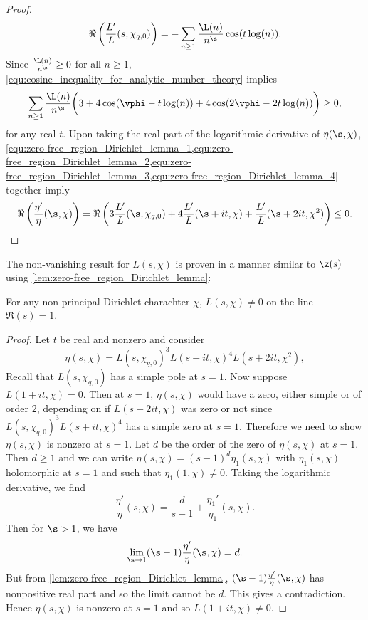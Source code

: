 \begin{proof}
\begin{equation}
          \Re\left(\frac{L'}{L}(s,\chi_{q,0})\right) = -\sum_{n \ge 1}\frac{\L(n)}{n^{\s}}\cos(t\log(n)).
        \end{equation}
        Since $\frac{\L(n)}{n^{\s}} \ge 0$ for all $n \ge 1$, \cref{equ:cosine_inequality_for_analytic_number_theory} implies
        \begin{equation}\label{equ:zero-free_region_Dirichlet_lemma_4}
          \sum_{n \ge 1}\frac{\L(n)}{n^{\s}}\bigg(3+4\cos(\vphi-t\log(n))+4\cos(2\vphi-2t\log(n))\bigg) \ge 0,
        \end{equation}
        for any real $t$. Upon taking the real part of the logarithmic derivative of $\eta(\s,\chi)$, \cref{equ:zero-free_region_Dirichlet_lemma_1,equ:zero-free_region_Dirichlet_lemma_2,equ:zero-free_region_Dirichlet_lemma_3,equ:zero-free_region_Dirichlet_lemma_4} together imply
        \[
          \Re\left(\frac{\eta'}{\eta}(\s,\chi)\right) = \Re\left(3\frac{L'}{L}(\s,\chi_{q,0})+4\frac{L'}{L}(\s+it,\chi)+\frac{L'}{L}(\s+2it,\chi^{2})\right) \le 0.
        \]
      \end{proof}

      The non-vanishing result for $L(s,\chi)$ is proven in a manner similar to $\z(s)$ using \cref{lem:zero-free_region_Dirichlet_lemma}:

      \begin{theorem}\label{thm:non-vanishing_of_Dirichlet_on_Re(s)=1}
        For any non-principal Dirichlet charachter $\chi$, $L(s,\chi) \neq 0$ on the line $\Re(s) = 1$.
      \end{theorem}
      \begin{proof}
        Let $t$ be real and nonzero and consider
        \[
          \eta(s,\chi) = L(s,\chi_{q,0})^{3}L(s+it,\chi)^{4}L(s+2it,\chi^{2}),
        \]
        Recall that $L(s,\chi_{q,0})$ has a simple pole at $s = 1$. Now suppose $L(1+it,\chi) = 0$. Then at $s = 1$, $\eta(s,\chi)$ would have a zero, either simple or of order $2$, depending on if $L(s+2it,\chi)$ was zero or not since $L(s,\chi_{q,0})^{3}L(s+it,\chi)^{4}$ has a simple zero at $s = 1$. Therefore we need to show $\eta(s,\chi)$ is nonzero at $s = 1$. Let $d$ be the order of the zero of $\eta(s,\chi)$ at $s = 1$. Then $d \ge 1$ and we can write $\eta(s,\chi) = (s-1)^{d}\eta_{1}(s,\chi)$ with $\eta_{1}(s,\chi)$ holomorphic at $s = 1$ and such that $\eta_{1}(1,\chi) \neq 0$. Taking the logarithmic derivative, we find
        \[
          \frac{\eta'}{\eta}(s,\chi) = \frac{d}{s-1}+\frac{\eta_{1}'}{\eta_{1}}(s,\chi).
        \]
        Then for $\s > 1$, we have
        \[
          \lim_{\s \to 1}(\s-1)\frac{\eta'}{\eta}(\s,\chi) = d.
        \]
        But from \cref{lem:zero-free_region_Dirichlet_lemma}, $(\s-1)\frac{\eta'}{\eta}(\s,\chi)$ has nonpositive real part and so the limit cannot be $d$. This gives a contradiction. Hence $\eta(s,\chi)$ is nonzero at $s = 1$ and so $L(1+it,\chi) \neq 0$.
      \end{proof}

